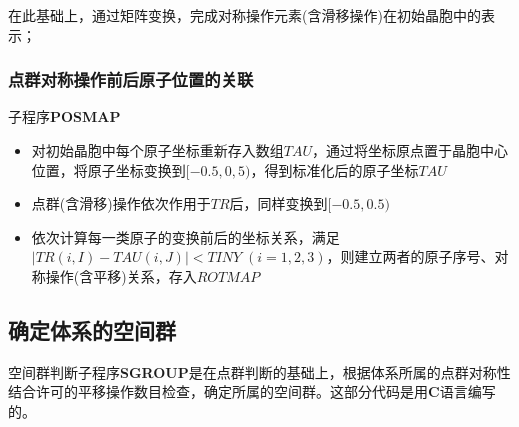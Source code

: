 在此基础上，通过矩阵变换，完成对称操作元素(含滑移操作)在初始晶胞中的表示；
\subsubsection{点群对称操作前后原子位置的关联}
子程序\textbf{POSMAP}\\
\begin{itemize}
	\item 对初始晶胞中每个原子坐标重新存入数组$\mathit{TAU}$，通过将坐标原点置于晶胞中心位置，将原子坐标变换到$[-0.5,0,5)$，得到标准化后的原子坐标$\mathit{TAU}$
		\item 点群(含滑移)操作依次作用于$\mathit{TR}$后，同样变换到$[-0.5,0.5)$
		\item 依次计算每一类原子的变换前后的坐标关系，满足$|\mathit{TR}(i,I)-\mathit{TAU}(i,J)|<\mathit{TINY}\;(i=1,2,3)$，则建立两者的原子序号、对称操作(含平移)关系，存入$\mathit{ROTMAP}$
\end{itemize}

\subsection{确定体系的空间群}
空间群判断子程序\textbf{SGROUP}是在点群判断的基础上，根据体系所属的点群对称性结合许可的平移操作数目检查，确定所属的空间群。这部分代码是用\textbf{C}语言编写的。
